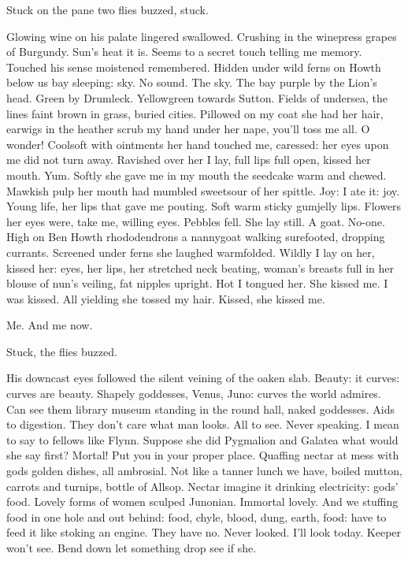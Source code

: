 Stuck on the pane two flies buzzed, stuck.

Glowing wine on his palate lingered swallowed. Crushing in the winepress
grapes of Burgundy. Sun's heat it is. Seems to a secret touch telling me
memory. Touched his sense moistened remembered. Hidden under wild ferns
on Howth below us bay sleeping: sky. No sound. The sky. The bay purple by
the Lion's head. Green by Drumleck. Yellowgreen towards Sutton. Fields of
undersea, the lines faint brown in grass, buried cities. Pillowed on my
coat she had her hair, earwigs in the heather scrub my hand under her
nape, you'll toss me all. O wonder! Coolsoft with ointments her hand
touched me, caressed: her eyes upon me did not turn away. Ravished over
her I lay, full lips full open, kissed her mouth. Yum. Softly she gave me
in my mouth the seedcake warm and chewed. Mawkish pulp her mouth had
mumbled sweetsour of her spittle. Joy: I ate it: joy. Young life, her
lips that gave me pouting. Soft warm sticky gumjelly lips. Flowers her
eyes were, take me, willing eyes. Pebbles fell. She lay still. A goat.
No-one. High on Ben Howth rhododendrons a nannygoat walking surefooted,
dropping currants. Screened under ferns she laughed warmfolded. Wildly I
lay on her, kissed her: eyes, her lips, her stretched neck beating,
woman's breasts full in her blouse of nun's veiling, fat nipples upright.
Hot I tongued her. She kissed me. I was kissed. All yielding she tossed
my hair. Kissed, she kissed me.

Me. And me now.

Stuck, the flies buzzed.

His downcast eyes followed the silent veining of the oaken slab. Beauty:
it curves: curves are beauty. Shapely goddesses, Venus, Juno: curves the
world admires. Can see them library museum standing in the round hall,
naked goddesses. Aids to digestion. They don't care what man looks. All
to see. Never speaking. I mean to say to fellows like Flynn. Suppose she
did Pygmalion and Galatea what would she say first? Mortal! Put you in
your proper place. Quaffing nectar at mess with gods golden dishes, all
ambrosial. Not like a tanner lunch we have, boiled mutton, carrots and
turnips, bottle of Allsop. Nectar imagine it drinking electricity: gods'
food. Lovely forms of women sculped Junonian. Immortal lovely. And we
stuffing food in one hole and out behind: food, chyle, blood, dung,
earth, food: have to feed it like stoking an engine. They have no. Never
looked. I'll look today. Keeper won't see. Bend down let something drop
see if she.

